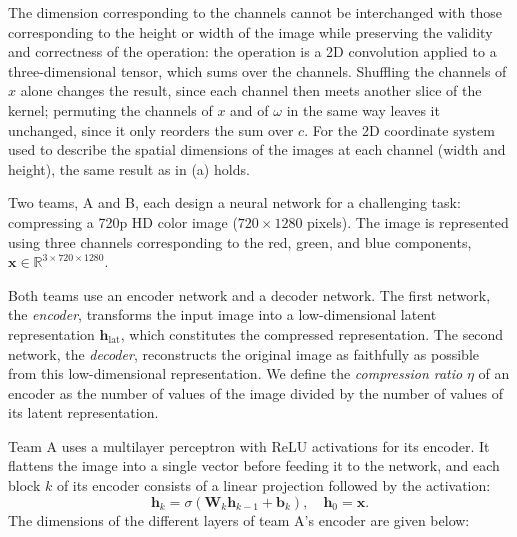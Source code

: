 \documentclass[11pt, a4paper]{exam}
\begin{document}
\begin{exercises}
\begin{parts}
    \begin{solution}
        The dimension corresponding to the channels cannot be interchanged with those corresponding to the height or width of the image while preserving the validity and correctness of the operation: the operation is a 2D convolution applied to a three-dimensional tensor, which sums over the channels. Shuffling the channels of $x$ alone changes the result, since each channel then meets another slice of the kernel; permuting the channels of $x$ and of $\omega$ in the same way leaves it unchanged, since it only reorders the sum over $c$. For the 2D coordinate system used to describe the spatial dimensions of the images at each channel (width and height), the same result as in (a) holds.
        \begin{center}
        \end{center}
    \end{solution}
\end{parts}


Two teams, A and B, each design a neural network for a challenging task: compressing a 720p HD color image ($720 \times 1280$ pixels). The image is represented using three channels corresponding to the red, green, and blue components, $\mathbf{x} \in \mathbb{R}^{3 \times 720 \times 1280}$.

Both teams use an encoder network and a decoder network. The first network, the \emph{encoder}, transforms the input image into a low-dimensional latent representation $\mathbf{h}_\text{lat}$, which constitutes the compressed representation. The second network, the \emph{decoder}, reconstructs the original image as faithfully as possible from this low-dimensional representation. We define the \emph{compression ratio} $\eta$ of an encoder as the number of values of the image divided by the number of values of its latent representation.

Team A uses a multilayer perceptron with ReLU activations for its encoder. It flattens the image into a single vector before feeding it to the network, and each block $k$ of its encoder consists of a linear projection followed by the activation:
\[
    \mathbf{h}_k = \sigma\left(\mathbf{W}_k \mathbf{h}_{k-1}+\mathbf{b}_k\right), \quad \mathbf{h}_0 = \mathbf{x}.
\]
The dimensions of the different layers of team A's encoder are given below:


\end{exercises}
\end{document}

